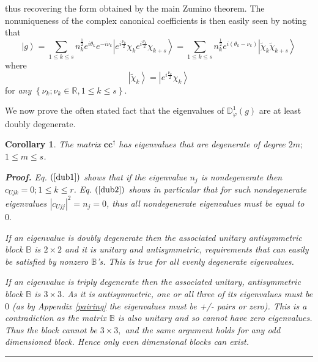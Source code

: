 \documentclass[preprint,aps,showkeys]{revtex4}%
\newtheorem{corollary}{Corollary}
\newenvironment{proof}[1][Proof]{\noindent\textbf{#1.} }{\ \rule{0.5em}{0.5em}}
\begin{document}
thus recovering the form obtained by the main Zumino theorem. The
nonuniqueness of the complex canonical coefficients is then easily seen by
noting that
\begin{equation}
\left\vert g\right\rangle =\sum_{1\leq k\leq s}n_{k}^{\frac{1}{2}}%
e^{i\theta_{k}}e^{-i\nu_{k}}\left\vert e^{i\frac{\nu_{k}}{2}}\chi_{k}%
e^{i\frac{\nu_{k}}{2}}\chi_{k+s}\right\rangle =\sum_{1\leq k\leq s}%
n_{k}^{\frac{1}{2}}e^{i\left(  \theta_{k}-\nu_{k}\right)  }\left\vert
\tilde{\chi}_{k}\tilde{\chi}_{k+s}\right\rangle
\end{equation}
where
\begin{equation}
\left\vert \tilde{\chi}_{k}\right\rangle =\left\vert e^{i\frac{\nu_{k}}{2}%
}\chi_{k}\right\rangle
\end{equation}
for \emph{any }$\left\{  \nu_{k};\nu_{k}\in\mathbb{R},1\leq k\leq s\right\}
.$

We now prove the often stated fact that the eigenvalues of $\mathbb{D}%
_{\varphi}^{1}\left(  g\right)  $ are at least doubly degenerate.

\begin{corollary}
The matrix $\mathbf{cc}^{\dagger}$ has eigenvalues that are degenerate of
degree $2m;$ $1\leq m\leq s$.

\begin{proof}
Eq. $\left(  \ref{dub1}\right)  $ shows that if the eigenvalue $n_{j}$ is
nondegenerate then $c_{Ujk}=0;1\leq k\leq r$. Eq. $\left(  \ref{dub2}\right)
$ shows in particular that for such nondegenerate eigenvalues $\left\vert
c_{Ujj}\right\vert ^{2}=n_{j}=0$, thus all nondegenerate eigenvalues must be
equal to $0.$

If an eigenvalue is doubly degenerate then the associated unitary
antisymmetric block $\mathbb{B}$ is $2\times2$ and it is unitary and
antisymmetric, requirements that can easily be satisfied by nonzero
$\mathbb{B}$'s. This is true for all evenly degenerate eigenvalues.

If an eigenvalue is triply degenerate then the associated unitary,
antisymmetric block $\mathbb{B}$ is $3\times3$. As it is antisymmetric, one or
all three of its eigenvalues must be $0$ (as by Appendix \ref{pairing} the
eigenvalues must be +/- pairs or zero). This is a contradiction as the matrix
$\mathbb{B}$ is also unitary and so cannot have zero eigenvalues. Thus the
block cannot be $3\times3,$ and the same argument holds for any odd
dimensioned block. Hence only even dimensional blocks can exist.
\end{proof}
\end{corollary}
\end{document}
